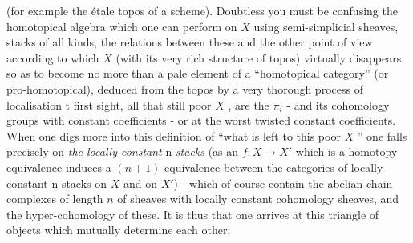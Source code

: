 
(for example the étale topos of a scheme). Doubtless you must be confusing
the homotopical algebra which one can perform on $X$ \over{;}{\unsure{,}} using semi-simplicial
sheaves,  stacks of all kinds, the relations between these \inserted{-} and the other
point of view according to which $X$ (with its very rich structure of topos)
virtually disappears so as to become no more than a pale element of a
``homotopical category'' (or pro-homotopical), deduced from the topos by a
very thorough process of localisation t  first sight, all that still
 poor  $X$ , are the $\pi_i$ - and its cohomology groups with constant
coefficients - or at the worst twisted constant coefficients. When one digs
more into this definition of ``what is left to this poor $X$ '' one falls
precisely on \textit{the locally constant} n-\textit{stacks} (as an $f : X \to X'$ which is a
homotopy equivalence induces a $(n + 1)$-equivalence between the categories
of locally constant n-stacks on $X$ and on $X'$) - which of course contain
the abelian chain complexes of length $n$ of sheaves with locally constant
cohomology sheaves, and the hyper-cohomology of these. It is thus that one
arrives at this triangle of objects which mutually determine each other:


